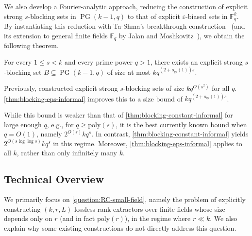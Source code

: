 \documentclass[11pt]{article}
\newif\ifdraft
\newcommand{\ZGnote}[1]{\ifdraft\textcolor{blue}{[Zeyu: #1]}\fi}
\newcommand{\eps}{\varepsilon}
\newcommand{\F}{\mathbb{F}}
\newcommand{\poly}{\mathrm{poly}}
\DeclareMathOperator{\PG}{PG}
\begin{document}
We also develop a Fourier-analytic approach, reducing the construction of explicit strong $s$-blocking sets in $\PG(k-1,q)$ to that of explicit $\eps$-biased sets in $\F_q^k$. By instantiating this reduction with Ta-Shma's breakthrough construction~\cite{Ta17} (and its extension to general finite fields $\F_q$ by Jalan and Moshkovitz~\cite{JM21}), we obtain the following theorem.

\begin{theorem}\label{thm:blocking-eps-informal}
For every $1\le s<k$ and every prime power $q>1$, there exists an explicit strong $s$-blocking set $B\subseteq \PG(k-1,q)$ of size at most $k q^{(2+o_{qs}(1))s}$.
\end{theorem}

Previously, \cite[Theorem~17]{BT24} constructed explicit strong $s$-blocking sets of size $k q^{O(s^2)}$ for all $q$. 
\cref{thm:blocking-eps-informal} improves this to a size bound of $k q^{(2+o_{qs}(1))s}$.

While this bound is weaker than that of \cref{thm:blocking-constant-informal} for large enough $q$, e.g., for $q\ge \poly(s)$, it is the best currently known bound when $q=O(1)$, namely $2^{O(s)} k q^s$. In contrast, \cref{thm:blocking-constant-informal} yields $2^{O(s\log\log s)} k q^s$ in this regime. Moreover, \cref{thm:blocking-eps-informal} applies to all $k$, rather than only infinitely many $k$.





\subsection{Technical Overview} 

We primarily focus on \cref{question:RC-small-field}, namely the problem of explicitly constructing $(k,r,L)$ lossless rank extractors over finite fields whose size depends only on $r$ (and in fact $\poly(r)$), in the regime where $r\ll k$. We also explain why some existing constructions do not directly address this question. 
\end{document}
